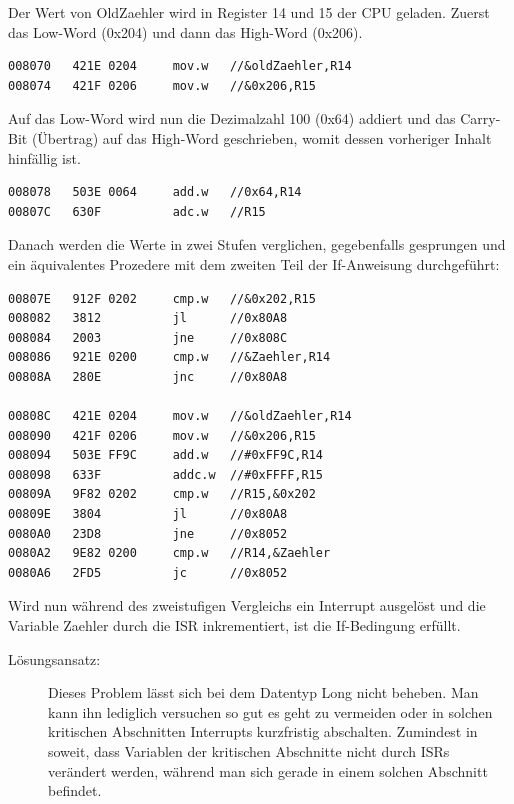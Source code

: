 \documentclass[12pt,a4paper,bibliography=totocnumbered,listof=totocnumbered]{scrartcl}
\begin{document}
Der Wert von OldZaehler wird in Register 14 und 15 der CPU geladen. Zuerst das Low-Word (0x204) und dann das High-Word (0x206).
\begin{lstlisting}[caption=Assemblercode MSP430, label=lst:LongInterruptA1]
008070   421E 0204     mov.w   //&oldZaehler,R14
008074   421F 0206     mov.w   //&0x206,R15
\end{lstlisting}

Auf das Low-Word wird nun die Dezimalzahl 100 (0x64) addiert und das Carry-Bit (Übertrag) auf das High-Word geschrieben, womit dessen vorheriger Inhalt hinfällig ist.
\begin{lstlisting}[caption=Assemblercode MSP430, label=lst:LongInterruptA2]
008078   503E 0064     add.w   //0x64,R14
00807C   630F          adc.w   //R15
\end{lstlisting}

Danach werden die Werte in zwei Stufen verglichen, gegebenfalls gesprungen und ein äquivalentes Prozedere mit dem zweiten Teil der If-Anweisung durchgeführt:
\begin{lstlisting}[caption=Assemblercode MSP430, label=lst:LongInterruptA3]
00807E   912F 0202     cmp.w   //&0x202,R15
008082   3812          jl      //0x80A8
008084   2003          jne     //0x808C
008086   921E 0200     cmp.w   //&Zaehler,R14
00808A   280E          jnc     //0x80A8

00808C   421E 0204     mov.w   //&oldZaehler,R14  
008090   421F 0206     mov.w   //&0x206,R15
008094   503E FF9C     add.w   //#0xFF9C,R14
008098   633F          addc.w  //#0xFFFF,R15 
00809A   9F82 0202     cmp.w   //R15,&0x202
00809E   3804          jl      //0x80A8
0080A0   23D8          jne     //0x8052
0080A2   9E82 0200     cmp.w   //R14,&Zaehler
0080A6   2FD5          jc      //0x8052
\end{lstlisting}

Wird nun während des zweistufigen Vergleichs ein Interrupt ausgelöst und die Variable Zaehler durch die ISR inkrementiert, ist die If-Bedingung erfüllt.
\begin{description}
	\item[Lösungsansatz:] Dieses Problem lässt sich bei dem Datentyp Long nicht beheben. Man kann ihn lediglich versuchen so gut es geht zu vermeiden oder in solchen kritischen Abschnitten Interrupts kurzfristig abschalten. Zumindest in soweit, dass Variablen der kritischen Abschnitte nicht durch ISRs verändert werden, während man sich gerade in einem solchen Abschnitt befindet.
\end{description}
\pagebreak
\end{document}
